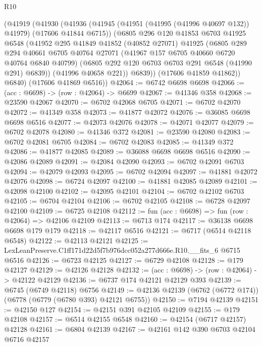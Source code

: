 \begin{lexlean}{R10}
\begin{coremodule}
      (@41919
        (@41930
          (@41936
            (@41945 (@41951 (@41995 (@41996 @40697 @132)) @41979) (@17606 @41844 @6715))
            (@6805
              @296
              @120
              @41853
              @6703
              @41925
              @6548
              (@41952
                @295
                @41849
                @41852
                (@40852 @27071)
                @41925
                (@6805
                  @289
                  @294
                  @40661
                  @6705
                  @40764
                  @27071
                  (@41967 @157 @6705 @40660 @6720 @40764 @6840 @40799)
                  (@6805 @292 @120 @6703 @6703 @291 @6548 (@41990 @291) @6839))
                (@41996 @40658 @221))
              @6839))
          (@17606 @41859 @41862))
        @6840)
      (@17606 @41869 @6516))
@42064 := @6742 @6698 @6698
@42066 := (acc : @6698) -> (row : @42064) -> @6699
@42067 := @41346 @358
@42068 := @23590 @42067
@42070 := @6702 @42068 @6705
@42071 := @6702 @42070
@42072 := @41349 @358
@42073 := @41877 @42072
@42076 := @36085 @6698 @6698 @6516
@42077 := @42073 @42076
@42078 := @42071 @42077
@42079 := @6702 @42078
@42080 := @41346 @372
@42081 := @23590 @42080
@42083 := @6702 @42081 @6705
@42084 := @6702 @42083
@42085 := @41349 @372
@42086 := @41877 @42085
@42089 := @36088 @6698 @6698 @6516
@42090 := @42086 @42089
@42091 := @42084 @42090
@42093 := @6702 @42091 @6703
@42094 := @42079 @42093
@42095 := @6702 @42094
@42097 := @41881 @42072 @42076
@42098 := @6724 @42097
@42100 := @41881 @42085 @42089
@42101 := @42098 @42100
@42102 := @42095 @42101
@42104 := @6702 @42102 @6703
@42105 := @6704 @42104
@42106 := @6702 @42105
@42108 := @6728 @42097 @42100
@42109 := @6725 @42108
@42112 := fun (acc : @6698) => fun (row : @42064) => @42106 @42109
@42113 := @6713 @174
@42117 := @36138 @6698 @6698 @179 @179
@42118 := @42117 @6516
@42121 := @6717 (@6514 @42118 @6548)
@42122 := @42113 @42121
@42125 := LexLeanPreserve.C1ff171d22d5f7b976dcc052a277d666e.R10.__fits_6 @6715 @6516
@42126 := @6723 @42125
@42127 := @6729 @42108
@42128 := @179 @42127
@42129 := @42126 @42128
@42132 := (acc : @6698) -> (row : @42064) -> @42122 @42129
@42136 := @6737 @174 @42121 @42129 @393
@42139 := @6745 (@6749 @42118) @6756
@42149 := @42136 @42139 (@6762 (@6772 @174)) (@6778 (@6779 (@6780 @393) @42121 @6755))
@42150 := @7194 @42139
@42151 := @42150 @127
@42154 := @42151 @391 @42105 @42109
@42155 := @179 @42108
@42157 := @6514 @42155 @6548
@42160 := @42154 (@6717 @42157) @42128
@42161 := @6804 @42139
@42167 := @42161 @142 @390 @6703 @42104 @6716 @42157

\end{coremodule}
\end{lexlean}
